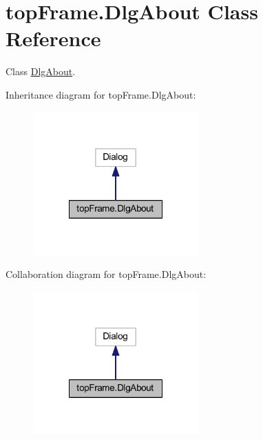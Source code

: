 \hypertarget{classtop_frame_1_1_dlg_about}{\section{top\-Frame.\-Dlg\-About Class Reference}
\label{classtop_frame_1_1_dlg_about}
}


Class \hyperlink{classtop_frame_1_1_dlg_about}{Dlg\-About}.  




Inheritance diagram for top\-Frame.\-Dlg\-About\-:\nopagebreak
\begin{figure}[H]
\begin{center}
\leavevmode
\includegraphics[width=180pt]{classtop_frame_1_1_dlg_about__inherit__graph}
\end{center}
\end{figure}


Collaboration diagram for top\-Frame.\-Dlg\-About\-:\nopagebreak
\begin{figure}[H]
\begin{center}
\leavevmode
\includegraphics[width=180pt]{classtop_frame_1_1_dlg_about__coll__graph}
\end{center}
\end{figure}
